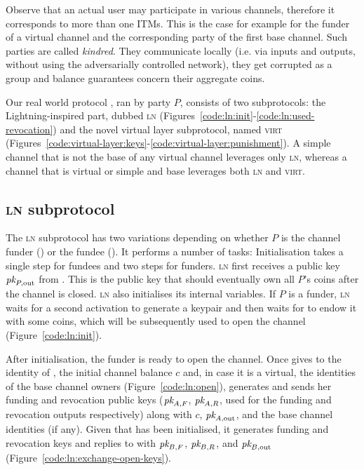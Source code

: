   Observe that an actual user may participate in various channels, therefore it
  corresponds to more than one ITMs. This is the case for example for the funder
  of a virtual channel and the corresponding party of the first base channel.
  Such parties are called \emph{kindred}. They communicate locally (i.e. via
  inputs and outputs, without using the adversarially controlled network), they
  get corrupted as a group and balance guarantees concern their aggregate coins.

  Our real world protocol \pchan, ran by party $P$, consists of two
  subprotocols: the Lightning-inspired part, dubbed \textsc{ln}
  (Figures~\ref{code:ln:init}-\ref{code:ln:used-revocation}) and the novel
  virtual layer subprotocol, named \textsc{virt}
  (Figures~\ref{code:virtual-layer:keys}-\ref{code:virtual-layer:punishment}). A
  simple channel that is not the base of any virtual channel leverages only
  \textsc{ln}, whereas a channel that is virtual or simple and base leverages
  both \textsc{ln} and \textsc{virt}.

\subsection{\textsc{ln} subprotocol}
  \label{construction:ln}
  The \textsc{ln} subprotocol has two variations depending on whether $P$ is the
  channel funder (\alice) or the fundee (\bob). It performs a number of tasks:
  Initialisation takes a single step for fundees and two steps for funders.
  \textsc{ln} first receives a public key $\textit{pk}_{P, \mathrm{out}}$ from
  \environment. This is the public key that should eventually own all $P$'s
  coins after the channel is closed. \textsc{ln} also initialises its internal
  variables. If $P$ is a funder, \textsc{ln} waits for a second activation to
  generate a keypair and then waits for \environment to endow it with some
  coins, which will be subsequently used to open the channel
  (Figure~\ref{code:ln:init}).

  After initialisation, the funder \alice is ready to open the channel. Once
  \environment gives to \alice the identity of \bob, the initial channel balance
  $c$ and,
  in case it is a virtual, the identities of the base channel owners
  (Figure~\ref{code:ln:open}), \alice generates and sends \bob her funding and
  revocation public keys ($\textit{pk}_{A, F}$, $\textit{pk}_{A, R}$, used for the funding and
  revocation outputs respectively) along with $c$, $\textit{pk}_{A,
  \mathrm{out}}$, and the base channel identities (if any). Given that \bob has
  been initialised, it generates funding and revocation keys and replies to
  \alice with $\textit{pk}_{B, F}$, $\textit{pk}_{B, R}$, and $\textit{pk}_{B, \mathrm{out}}$
  (Figure~\ref{code:ln:exchange-open-keys}).

